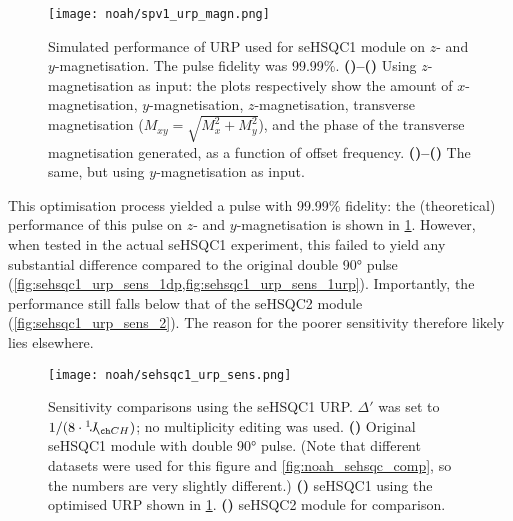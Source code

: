 \begin{figure}[!ht]
    \centering
    \texttt{[image: noah/spv1\_urp\_magn.png]}%
    {\label{fig:spv1_urp_magn_z_x}}%
    {\label{fig:spv1_urp_magn_z_y}}%
    {\label{fig:spv1_urp_magn_z_z}}%
    {\label{fig:spv1_urp_magn_z_xy}}%
    {\label{fig:spv1_urp_magn_z_phase}}%
    {\label{fig:spv1_urp_magn_y_x}}%
    {\label{fig:spv1_urp_magn_y_y}}%
    {\label{fig:spv1_urp_magn_y_z}}%
    {\label{fig:spv1_urp_magn_y_xy}}%
    {\label{fig:spv1_urp_magn_y_phase}}%
    \caption[Simulated performance of URP used for seHSQC1 module]{
        Simulated performance of URP used for seHSQC1 module on $z$- and $y$-magnetisation. The pulse fidelity was 99.99\%.
        \textbf{()--()} Using $z$-magnetisation as input: the plots respectively show the amount of $x$-magnetisation, $y$-magnetisation, $z$-magnetisation, transverse magnetisation ($M_{xy} = \sqrt{M_x^2 + M_y^2}$), and the phase of the transverse magnetisation generated, as a function of offset frequency.
        \textbf{()--()} The same, but using $y$-magnetisation as input.
    }
    \label{fig:spv1_urp_magn}
\end{figure}

This optimisation process yielded a pulse with 99.99\% fidelity: the (theoretical) performance of this pulse on $z$- and $y$-magnetisation is shown in \cref{fig:spv1_urp_magn}.
However, when tested in the actual seHSQC1 experiment, this failed to yield any substantial difference compared to the original double \ang{90} pulse (\cref{fig:sehsqc1_urp_sens_1dp,fig:sehsqc1_urp_sens_1urp}).
Importantly, the performance still falls below that of the seHSQC2 module (\cref{fig:sehsqc1_urp_sens_2}).
The reason for the poorer sensitivity therefore likely lies elsewhere.

\begin{figure}[htb]
    \centering
    \texttt{[image: noah/sehsqc1\_urp\_sens.png]}%
    {\label{fig:sehsqc1_urp_sens_1dp}}%
    {\label{fig:sehsqc1_urp_sens_1urp}}%
    {\label{fig:sehsqc1_urp_sens_2}}%
    \caption[Sensitivity comparison of seHSQC1 module with URP]{
        Sensitivity comparisons using the seHSQC1 URP.
        $\Delta'$ was set to $1 / (8 \cdot \oneJ{CH})$; no multiplicity editing was used.
        \textbf{()} Original seHSQC1 module with double \proton{} \ang{90} pulse.
        (Note that different datasets were used for this figure and \cref{fig:noah_sehsqc_comp}, so the numbers are very slightly different.)
        \textbf{()} seHSQC1 using the optimised URP shown in \cref{fig:spv1_urp_magn}.
        \textbf{()} seHSQC2 module for comparison.
    }
    \label{fig:sehsqc1_urp_sens}
\end{figure}


